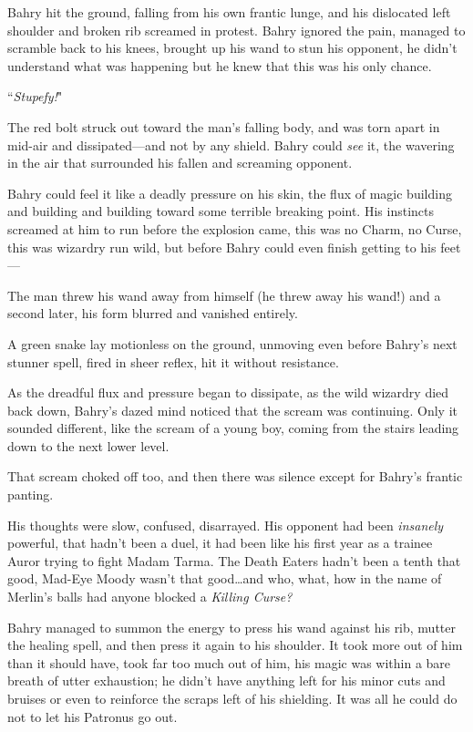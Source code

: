 Bahry hit the ground, falling from his own frantic lunge, and his dislocated left shoulder and broken rib screamed in protest. Bahry ignored the pain, managed to scramble back to his knees, brought up his wand to stun his opponent, he didn't understand what was happening but he knew that this was his only chance.

``\emph{Stupefy!}"

The red bolt struck out toward the man's falling body, and was torn apart in mid-air and dissipated—and not by any shield. Bahry could \emph{see} it, the wavering in the air that surrounded his fallen and screaming opponent.

Bahry could feel it like a deadly pressure on his skin, the flux of magic building and building and building toward some terrible breaking point. His instincts screamed at him to run before the explosion came, this was no Charm, no Curse, this was wizardry run wild, but before Bahry could even finish getting to his feet—

The man threw his wand away from himself (he threw away his wand!) and a second later, his form blurred and vanished entirely.

A green snake lay motionless on the ground, unmoving even before Bahry's next stunner spell, fired in sheer reflex, hit it without resistance.

As the dreadful flux and pressure began to dissipate, as the wild wizardry died back down, Bahry's dazed mind noticed that the scream was continuing. Only it sounded different, like the scream of a young boy, coming from the stairs leading down to the next lower level.

That scream choked off too, and then there was silence except for Bahry's frantic panting.

His thoughts were slow, confused, disarrayed. His opponent had been \emph{insanely} powerful, that hadn't been a duel, it had been like his first year as a trainee Auror trying to fight Madam Tarma. The Death Eaters hadn't been a tenth that good, Mad-Eye Moody wasn't that good…and who, what, how in the name of Merlin's balls had anyone blocked a \emph{Killing Curse?}

Bahry managed to summon the energy to press his wand against his rib, mutter the healing spell, and then press it again to his shoulder. It took more out of him than it should have, took far too much out of him, his magic was within a bare breath of utter exhaustion; he didn't have anything left for his minor cuts and bruises or even to reinforce the scraps left of his shielding. It was all he could do not to let his Patronus go out.

